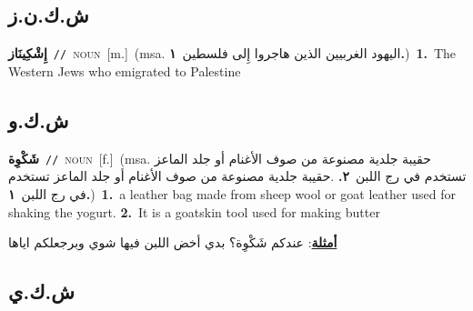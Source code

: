 \documentclass[10pt,a4paper,twoside]{article} %
\begin{document}
\begin{multicols}{2}
\vspace{-3mm}
\subsection*{\color{blue}\foreignlanguage{arabic}{ش.ك.ن.ز}\color{blue}{ (ntws)}} 

{\setlength\topsep{0pt}\textbf{\foreignlanguage{arabic}{إِشْكِينَاز}}\ {\color{gray}\texttt{//}\color{black}}\ \textsc{noun}\ [m.]\ \color{gray}(msa. \foreignlanguage{arabic}{اليهود الغربيين الذين هاجروا إِلى فلسطين}~\foreignlanguage{arabic}{\textbf{١.}})\color{black}\ \textbf{1.}~The Western Jews who emigrated to Palestine\ } \vspace{2mm}

\vspace{-3mm}
\subsection*{\color{blue}\foreignlanguage{arabic}{ش.ك.و}\color{blue}{}} 

{\setlength\topsep{0pt}\textbf{\foreignlanguage{arabic}{شَكْوِة}}\ {\color{gray}\texttt{//}\color{black}}\ \textsc{noun}\ [f.]\ \color{gray}(msa. \foreignlanguage{arabic}{حقيبة جلدية مصنوعة من صوف الأغنام أو جلد الماعز تستخدم في رج اللبن}~\foreignlanguage{arabic}{\textbf{٢.}}  .\foreignlanguage{arabic}{حقيبة جلدية مصنوعة من صوف الأغنام أو جلد الماعز تستخدم في رج اللبن}~\foreignlanguage{arabic}{\textbf{١.}})\color{black}\ \textbf{1.}~a leather bag made from sheep wool or goat leather used for shaking the yogurt.  \textbf{2.}~It is a goatskin tool used for making butter\  \begin{flushright}\color{gray}\foreignlanguage{arabic}{\textbf{\underline{\foreignlanguage{arabic}{أمثلة}}}: عندكم شَكْوِة؟ بدي أخض اللبن فيها شوي وبرجعلكم اياها}\end{flushright}\color{black}} \vspace{2mm}

\vspace{-3mm}
\subsection*{\color{blue}\foreignlanguage{arabic}{ش.ك.ي}\color{blue}{}} 


\end{multicols}
\end{document}
